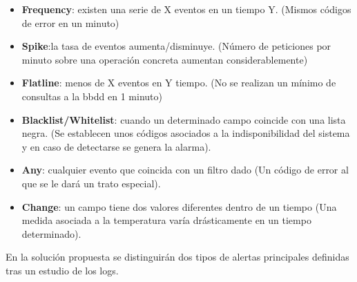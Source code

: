 \begin{itemize}
\item \textbf{Frequency}: existen una serie de X eventos en un tiempo Y. (Mismos códigos de error en un minuto)
\item \textbf{Spike}:la tasa de eventos aumenta/disminuye. (Número de peticiones por minuto sobre una operación concreta aumentan considerablemente) 
\item \textbf{Flatline}: menos de X eventos en Y tiempo. (No se realizan un mínimo de consultas a la bbdd en 1 minuto)
\item \textbf{Blacklist/Whitelist}: cuando un determinado campo coincide con una lista negra. (Se establecen unos códigos asociados a la indisponibilidad del sistema y en caso de detectarse se genera la alarma).
\item \textbf{Any}: cualquier evento que coincida con un filtro dado (Un código de error al que se le dará un trato especial).
\item \textbf{Change}: un campo tiene dos valores diferentes dentro de un tiempo (Una medida asociada a la temperatura varía drásticamente en un tiempo determinado).


\end{itemize}

En la solución propuesta se distinguirán dos tipos de alertas principales definidas tras un estudio de los logs.

